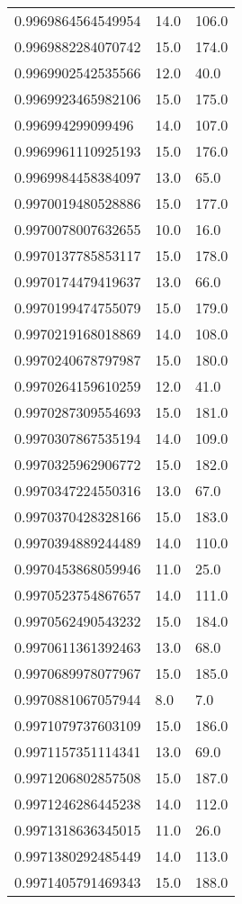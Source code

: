 \begin{center}
\begin{supertabular}[H]{p{0.30\textwidth}p{0.05\textwidth}p{0.05\textwidth}}
0.9969864564549954 & 14.0 & 106.0 \\ 
0.9969882284070742 & 15.0 & 174.0 \\ 
0.9969902542535566 & 12.0 & 40.0 \\ 
0.9969923465982106 & 15.0 & 175.0 \\ 
0.996994299099496 & 14.0 & 107.0 \\ 
0.9969961110925193 & 15.0 & 176.0 \\ 
0.9969984458384097 & 13.0 & 65.0 \\ 
0.9970019480528886 & 15.0 & 177.0 \\ 
0.9970078007632655 & 10.0 & 16.0 \\ 
0.9970137785853117 & 15.0 & 178.0 \\ 
0.9970174479419637 & 13.0 & 66.0 \\ 
0.9970199474755079 & 15.0 & 179.0 \\ 
0.9970219168018869 & 14.0 & 108.0 \\ 
0.9970240678797987 & 15.0 & 180.0 \\ 
0.9970264159610259 & 12.0 & 41.0 \\ 
0.9970287309554693 & 15.0 & 181.0 \\ 
0.9970307867535194 & 14.0 & 109.0 \\ 
0.9970325962906772 & 15.0 & 182.0 \\ 
0.9970347224550316 & 13.0 & 67.0 \\ 
0.9970370428328166 & 15.0 & 183.0 \\ 
0.9970394889244489 & 14.0 & 110.0 \\ 
0.9970453868059946 & 11.0 & 25.0 \\ 
0.9970523754867657 & 14.0 & 111.0 \\ 
0.9970562490543232 & 15.0 & 184.0 \\ 
0.9970611361392463 & 13.0 & 68.0 \\ 
0.9970689978077967 & 15.0 & 185.0 \\ 
0.9970881067057944 & 8.0 & 7.0 \\ 
0.9971079737603109 & 15.0 & 186.0 \\ 
0.9971157351114341 & 13.0 & 69.0 \\ 
0.9971206802857508 & 15.0 & 187.0 \\ 
0.9971246286445238 & 14.0 & 112.0 \\ 
0.9971318636345015 & 11.0 & 26.0 \\ 
0.9971380292485449 & 14.0 & 113.0 \\ 
0.9971405791469343 & 15.0 & 188.0 \\ 

\end{supertabular}
\end{center}
